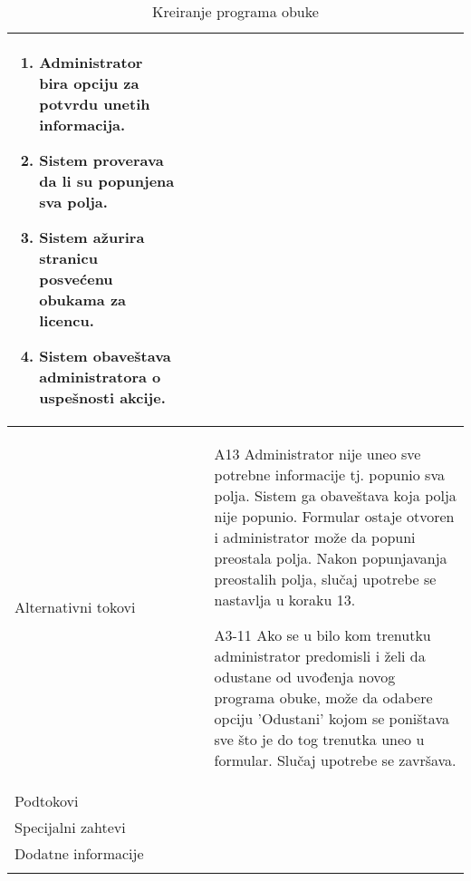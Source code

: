 \documentclass[../../main.tex]{subfiles}
\begin{document}
\begin{longtable}{| p{} | p{} |}
\begin{enumerate}
        \item Administrator bira opciju za potvrdu unetih informacija.
        \item Sistem proverava da li su popunjena sva polja.
        \item Sistem ažurira stranicu posvećenu obukama za licencu.
        \item Sistem obaveštava administratora o uspešnosti akcije.
    \end{enumerate}\\
\hline
    Alternativni tokovi & 
    \begin{itemize}
        \item[A13] Administrator nije uneo sve potrebne informacije tj. popunio sva polja. Sistem ga obaveštava koja polja nije popunio. Formular ostaje otvoren i administrator može da popuni preostala polja. Nakon popunjavanja preostalih polja, slučaj upotrebe se nastavlja u koraku 13.
        \item[A3-11] Ako se u bilo kom trenutku administrator predomisli i želi da odustane od uvođenja novog programa obuke, može da odabere opciju 'Odustani' kojom se poništava sve što je do tog trenutka uneo u formular. Slučaj upotrebe se završava.
    \end{itemize} \\
\hline
    Podtokovi & \\
\hline
    Specijalni zahtevi & \\
\hline
    Dodatne informacije & \\
\hline
\caption{Kreiranje programa obuke}
\end{longtable}
\end{document}
